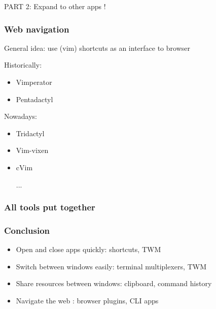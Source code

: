 \documentclass[aspectratio=169]{beamer}
\begin{document}

\begin{frame}[c]
    \begin{center}
        \huge PART 2: Expand to other apps !
    \end{center}
\end{frame}

\begin{frame}
    \frametitle{Web navigation}
    General idea: use (vim) shortcuts as an interface to browser\newline

    Historically:
    \begin{itemize}
    \item Vimperator
    \item Pentadactyl\newline
    \end{itemize}

    Nowadays:
    \begin{itemize}
    \item Tridactyl
    \item Vim-vixen
    \item cVim
    \item [...]
    \end{itemize}
\end{frame}

\begin{frame}
    \frametitle{All tools put together}
    \begin{center}
    \end{center}
\end{frame}

\begin{frame}
    \frametitle{Conclusion}
    \begin{itemize}
    \item Open and close apps quickly: shortcuts, TWM
    \item Switch between windows easily: terminal multiplexers, TWM
    \item Share resources between windows: clipboard, command history
    \item Navigate the web : browser plugins, CLI apps
    \end{itemize}
\end{frame}
\end{document}
